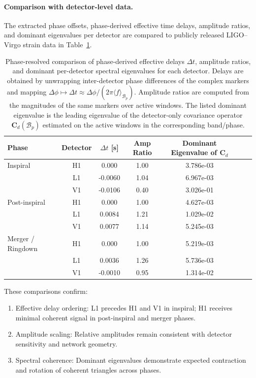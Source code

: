 \documentclass[11pt,a4paper]{article}
\begin{document}
\paragraph{Comparison with detector-level data.}
The extracted phase offsets, phase-derived effective time delays, amplitude ratios, and dominant eigenvalues per detector are compared to publicly released LIGO--Virgo strain data in Table~\ref{tab:detector_comparison}.

\begin{table}[H]
\centering
\caption{Phase-resolved comparison of phase-derived effective delays $\Delta t$, amplitude ratios, and dominant per-detector spectral eigenvalues for each detector.
Delays are obtained by unwrapping inter-detector phase differences of the complex markers and mapping $\Delta\phi\mapsto\Delta t\approx \Delta\phi/(2\pi\langle f\rangle_{\mathcal{B}_p})$.
Amplitude ratios are computed from the magnitudes of the same markers over active windows.
The listed dominant eigenvalue is the leading eigenvalue of the detector-only covariance operator $\mathbf{C}_d(\mathcal{B}_p)$ estimated on the active windows in the corresponding band/phase.}
\label{tab:detector_comparison}
\begin{tabular}{lcccccc}
\toprule
Phase & Detector & $\Delta t$ [s] & Amp Ratio & Dominant Eigenvalue of $\mathbf{C}_d$ \\
\midrule
Inspiral & H1 & 0.000 & 1.00 & 3.786e-03 \\
 & L1 & -0.0060 & 1.04 & 6.967e-03 \\
 & V1 & -0.0106 & 0.40 & 3.026e-01 \\
Post-inspiral & H1 & 0.000 & 1.00 & 4.627e-03 \\
 & L1 & 0.0084 & 1.21 & 1.029e-02 \\
 & V1 & 0.0077 & 1.14 & 5.245e-03 \\
Merger / Ringdown & H1 & 0.000 & 1.00 & 5.219e-03 \\
 & L1 & 0.0036 & 1.26 & 5.736e-03 \\
 & V1 & -0.0010 & 0.95 & 1.314e-02 \\
\bottomrule
\end{tabular}
\end{table}

These comparisons confirm:
\begin{enumerate}
    \item Effective delay ordering: L1 precedes H1 and V1 in inspiral; H1 receives minimal coherent signal in post-inspiral and merger phases.
    \item Amplitude scaling: Relative amplitudes remain consistent with detector sensitivity and network geometry.
    \item Spectral coherence: Dominant eigenvalues demonstrate expected contraction and rotation of coherent triangles across phases.
\end{enumerate}
\end{document}
